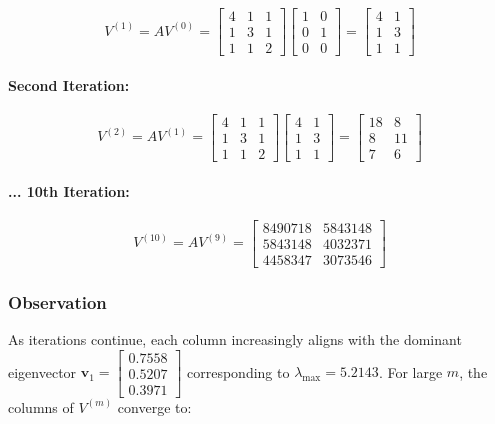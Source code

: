 \documentclass[12pt]{article}
\begin{document}
$$
V^{(1)} = A V^{(0)} = \begin{bmatrix} 4 & 1 & 1 \\ 1 & 3 & 1 \\ 1 & 1 & 2 \end{bmatrix} \begin{bmatrix} 1 & 0 \\ 0 & 1 \\ 0 & 0 \end{bmatrix} = \begin{bmatrix} 4 & 1 \\ 1 & 3 \\ 1 & 1 \end{bmatrix}
$$

\paragraph{Second Iteration:}

$$
V^{(2)} = A V^{(1)} = \begin{bmatrix} 4 & 1 & 1 \\ 1 & 3 & 1 \\ 1 & 1 & 2 \end{bmatrix} \begin{bmatrix} 4 & 1 \\ 1 & 3 \\ 1 & 1 \end{bmatrix} = \begin{bmatrix} 18 & 8 \\ 8 & 11 \\ 7 & 6 \end{bmatrix}
$$

\paragraph{... 10th Iteration:}

$$
V^{(10)} = A V^{(9)} = \begin{bmatrix} 8490718 & 5843148 \\ 5843148 & 4032371 \\ 4458347 & 3073546 \end{bmatrix}
$$

\subsubsection*{Observation}

As iterations continue, each column increasingly aligns with the dominant eigenvector $\mathbf{v}_1 = \begin{bmatrix} 0.7558 \\ 0.5207 \\ 0.3971 \end{bmatrix}$ corresponding to $\lambda_{\max} = 5.2143$. For large $ m $, the columns of $ V^{(m)} $ converge to:
\end{document}
